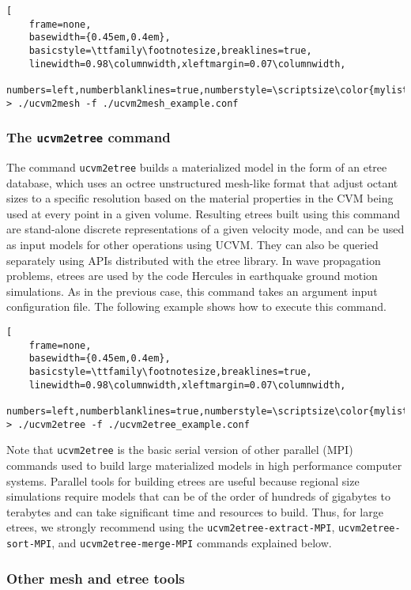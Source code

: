 \begin{lstlisting}[
	frame=none,
	basewidth={0.45em,0.4em},
	basicstyle=\ttfamily\footnotesize,breaklines=true,
	linewidth=0.98\columnwidth,xleftmargin=0.07\columnwidth,
	numbers=left,numberblanklines=true,numberstyle=\scriptsize\color{mylistingnclr}]
> ./ucvm2mesh -f ./ucvm2mesh_example.conf
\end{lstlisting}

\subsubsection{The \textup{\texttt{ucvm2etree}} command}

The command \texttt{ucvm2etree} builds a materialized model in the form of an etree database, which uses an octree unstructured mesh-like format that adjust octant sizes to a specific resolution based on the material properties in the CVM being used at every point in a given volume. Resulting etrees built using this command are stand-alone discrete representations of a given velocity mode, and can be used as input models for other operations using UCVM. They can also be queried separately using APIs distributed with the etree library. In wave propagation problems, etrees are used by the code Hercules \citep{Tu_2006_SC, Taborda_2010_Tech} in earthquake ground motion simulations. As in the previous case, this command takes an argument input configuration file. The following example shows how to execute this command.

\begin{lstlisting}[
	frame=none,
	basewidth={0.45em,0.4em},
	basicstyle=\ttfamily\footnotesize,breaklines=true,
	linewidth=0.98\columnwidth,xleftmargin=0.07\columnwidth,
	numbers=left,numberblanklines=true,numberstyle=\scriptsize\color{mylistingnclr}]
> ./ucvm2etree -f ./ucvm2etree_example.conf
\end{lstlisting}

Note that \texttt{ucvm2etree} is the basic serial version of other parallel (MPI) commands used to build large materialized models in high performance computer systems. Parallel tools for building etrees are useful because regional size simulations require models that can be of the order of hundreds of gigabytes to terabytes and can take significant time and resources to build. Thus, for large etrees, we strongly recommend using the \texttt{ucvm2etree-extract-MPI}, \texttt{ucvm2etree-sort-MPI}, and \texttt{ucvm2etree-merge-MPI} commands explained below.

\subsubsection{Other mesh and etree tools}

